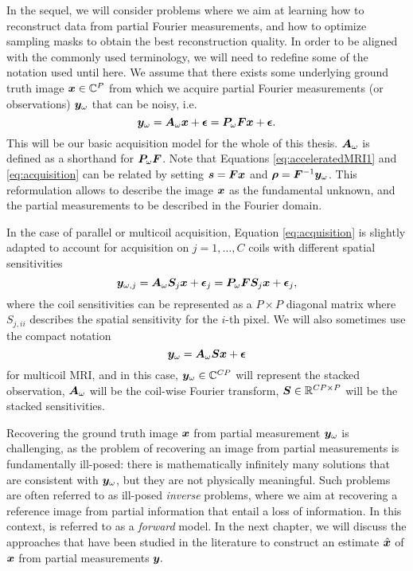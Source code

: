 In the sequel, we will consider problems where we aim at learning how to reconstruct data from partial Fourier measurements, and how to optimize sampling masks to obtain the best reconstruction quality. In order to be aligned with the commonly used terminology, we will need to redefine some of the notation used until here. We assume that there exists some underlying ground truth image ${\bm{x}} \in \mathbb{C}^P$ from which we acquire partial Fourier measurements (or observations) ${\bm{y}}_\omega$ that can be noisy, i.e. 
\begin{equation}
    {\bm{y}}_\omega = {\bm{A}}_\omega {\bm{x}} + \boldsymbol{\epsilon} = {\bm{P}}_\omega {\bm{F}} {\bm{x}} + \boldsymbol{\epsilon}.\label{eq:acquisition}
\end{equation}
This will be our basic acquisition model for the whole of this thesis. ${\bm{A}}_\omega$ is defined as a shorthand for ${\bm{P}}_\omega {\bm{F}}$. Note that Equations \ref{eq:acceleratedMRI1} and \ref{eq:acquisition} can be related by setting ${\bm{s}} = {\bm{F}}{\bm{x}}$ and $\boldsymbol{\rho} = {\bm{F}}^{-1} {\bm{y}}_\omega$. This reformulation allows to describe the image ${\bm{x}}$ as the fundamental unknown, and the partial measurements to be described in the Fourier domain.  

\begin{remark}
    In the case of parallel or multicoil acquisition, Equation \ref{eq:acquisition} is slightly adapted to account for acquisition on $j=1,\ldots,C$ coils with different spatial sensitivities
\begin{equation}
    {\bm{y}}_{\omega,j} = {\bm{A}}_\omega {\bm{S}}_j {\bm{x}} + \boldsymbol{\epsilon}_j = {\bm{P}}_{\omega} {\bm{F}} {\bm{S}}_j {\bm{x}}+ \boldsymbol{\epsilon}_j, \label{eq:acquisition_parallel}
\end{equation}
where the coil sensitivities can be represented as a $P\times P$ diagonal matrix where $S_{j,ii}$ describes the spatial sensitivity for the $i$-th pixel. We will also sometimes  use the compact notation 
\begin{equation} 
    {\bm{y}}_\omega = {\bm{A}}_\omega {\bm{S}} {\bm{x}} + \boldsymbol{\epsilon}\label{eq:acquisition_parallel_compact}
\end{equation}
for multicoil MRI, and in this case, ${\bm{y}}_\omega \in \mathbb{C}^{C P}$ will represent the stacked observation, ${\bm{A}}_\omega$ will be the coil-wise Fourier transform, ${\bm{S}} \in \mathbb{R}^{CP\times P}$ will be the stacked sensitivities.
\end{remark}


Recovering the ground truth image ${\bm{x}}$ from partial measurement ${\bm{y}}_\omega$ is challenging, as the problem of recovering an image from partial measurements is fundamentally ill-posed: there is mathematically infinitely many solutions that are consistent with ${\bm{y}}_\omega$, but they are not physically meaningful. Such problems are often referred to as ill-posed \textit{inverse} problems, where we aim at recovering a reference image from partial information that entail a loss of information. In this context,  is referred to as a \textit{forward} model. In the next chapter, we will discuss the approaches that have been studied in the literature to construct an estimate $\hat{{\bm{x}}}$ of ${\bm{x}}$ from partial measurements ${\bm{y}}.$


